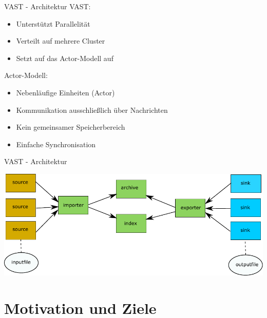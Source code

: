 \documentclass[9pt]{beamer}
\begin{document}
\begin{frame}{VAST - Architektur}{}
	VAST:
	\begin{itemize}
		\item Unterstützt Parallelität
		\item Verteilt auf mehrere Cluster
		\item Setzt auf das Actor-Modell auf
	\end{itemize}	
	Actor-Modell:
	\begin{itemize}
		\item Nebenläufige Einheiten (Actor)
		\item Kommunikation ausschließlich über Nachrichten
		\item Kein gemeinsamer Speicherbereich
		\item Einfache Synchronisation
	\end{itemize}
\end{frame}
\begin{frame}{VAST - Architektur}{}
	\begin{center}
		\includegraphics[width=1.0\textwidth]{res/vast.pdf}
	\end{center}
\end{frame}


\section{Motivation und Ziele}
\end{document}
